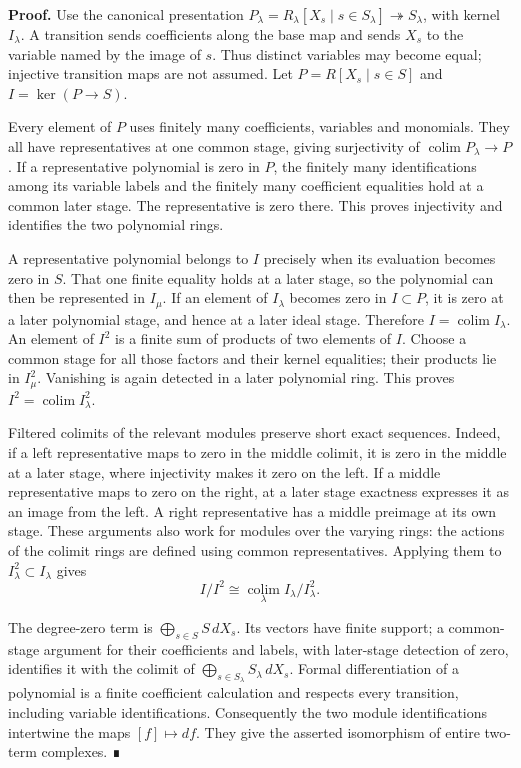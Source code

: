 \documentclass[11pt,a4paper,openany]{report}
\begin{document}
\textbf{Proof.} Use the canonical presentation \(P_\lambda=R_\lambda[X_s\mid s\in S_\lambda]\twoheadrightarrow S_\lambda\), with kernel \(I_\lambda\). A transition sends coefficients along the base map and sends \(X_s\) to the variable named by the image of \(s\). Thus distinct variables may become equal; injective transition maps are not assumed. Let \(P=R[X_s\mid s\in S]\) and \(I=\ker(P\to S)\).

Every element of \(P\) uses finitely many coefficients, variables and monomials. They all have representatives at one common stage, giving surjectivity of \(\operatorname*{colim}P_\lambda\to P\). If a representative polynomial is zero in \(P\), the finitely many identifications among its variable labels and the finitely many coefficient equalities hold at a common later stage. The representative is zero there. This proves injectivity and identifies the two polynomial rings.

A representative polynomial belongs to \(I\) precisely when its evaluation becomes zero in \(S\). That one finite equality holds at a later stage, so the polynomial can then be represented in \(I_\mu\). If an element of \(I_\lambda\) becomes zero in \(I\subset P\), it is zero at a later polynomial stage, and hence at a later ideal stage. Therefore \(I=\operatorname*{colim}I_\lambda\). An element of \(I^2\) is a finite sum of products of two elements of \(I\). Choose a common stage for all those factors and their kernel equalities; their products lie in \(I_\mu^2\). Vanishing is again detected in a later polynomial ring. This proves \(I^2=\operatorname*{colim}I_\lambda^2\).

Filtered colimits of the relevant modules preserve short exact sequences. Indeed, if a left representative maps to zero in the middle colimit, it is zero in the middle at a later stage, where injectivity makes it zero on the left. If a middle representative maps to zero on the right, at a later stage exactness expresses it as an image from the left. A right representative has a middle preimage at its own stage. These arguments also work for modules over the varying rings: the actions of the colimit rings are defined using common representatives. Applying them to \(I_\lambda^2\subset I_\lambda\) gives \[I/I^2\cong\operatorname*{colim}_\lambda I_\lambda/I_\lambda^2.\]

The degree-zero term is \(\bigoplus_{s\in S}S\,dX_s\). Its vectors have finite support; a common-stage argument for their coefficients and labels, with later-stage detection of zero, identifies it with the colimit of \(\bigoplus_{s\in S_\lambda}S_\lambda\,dX_s\). Formal differentiation of a polynomial is a finite coefficient calculation and respects every transition, including variable identifications. Consequently the two module identifications intertwine the maps \([f]\mapsto df\). They give the asserted isomorphism of entire two-term complexes. ∎
\end{document}
